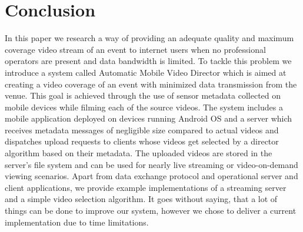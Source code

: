 \documentclass[conference]{IEEEtran}
\begin{document}
\section{Conclusion}
In this paper we research a way of providing an adequate quality and maximum coverage video stream of an event to internet users 
when no professional operators are present and data bandwidth is limited.
To tackle this problem we introduce a system called Automatic Mobile Video Director 
which is aimed at creating a video coverage of an event with minimized data transmission from the venue. 
This goal is achieved through the use of sensor metadata collected on mobile devices while filming each of the source videos.
The system includes a mobile application deployed on devices running Android OS 
and a server which receives metadata messages of negligible size compared to actual videos and dispatches upload requests to 
clients whose videos get selected by a director algorithm based on their metadata.
The uploaded videos are stored in the server's file system and can be used for nearly live streaming or video-on-demand
viewing scenarios.
Apart from data exchange protocol and operational server and client applications,
we provide example implementations of a streaming server and a simple video selection algorithm.
It goes without saying, that a lot of things can be done to improve our system, 
however we chose to deliver a current implementation due to time limitations.





%

\end{document}
